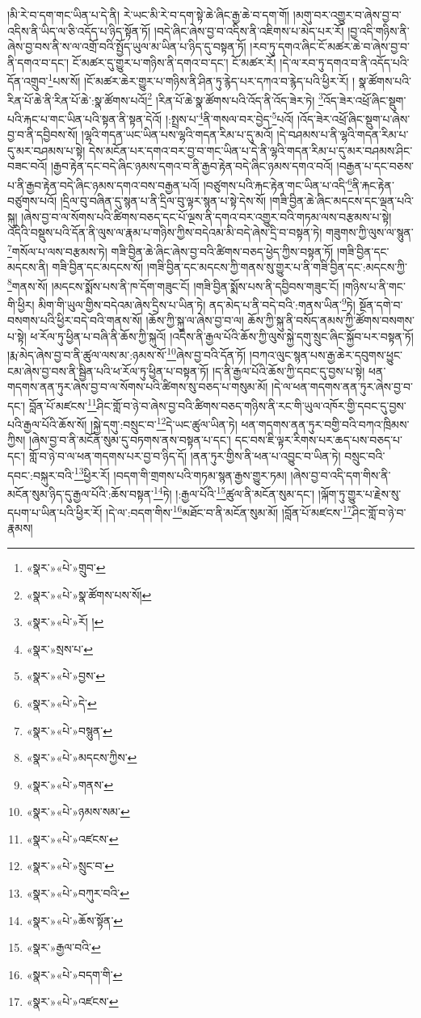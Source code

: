 །མི་རེ་བ་དག་གང་ཡིན་པ་དེ་ནི། རེ་ཡང་མི་རེ་བ་དག་སྟེ་ཆེ་ཞིང་རྒྱ་ཆེ་བ་དག་གོ། །མགུ་བར་འགྱུར་བ་ཞེས་བྱ་བ་འདིས་ནི་ཡིད་ལ་ཅི་འདོད་པ་ཉིད་སྟོན་ཏོ། །བདེ་ཞིང་ཞེས་བྱ་བ་འདིས་ནི་འཇིགས་པ་མེད་པར་རོ། །བྱ་འདི་གཉིས་ནི་ཞེས་བྱ་བས་ནི་ས་ལ་འགྲོ་བའི་སྤྱོད་ཡུལ་མ་ཡིན་པ་ཉིད་དུ་བསྟན་ཏོ། །རབ་ཏུ་དགའ་ཞིང་ངོ་མཚར་ཆེ་བ་ཞེས་བྱ་བ་ནི་དགའ་བ་དང་། ངོ་མཚར་དུ་གྱུར་པ་གཉིས་ནི་དགའ་བ་དང་། ངོ་མཚར་རོ། །དེ་ལ་རབ་ཏུ་དགའ་བ་ནི་འདོད་པའི་དོན་འགྲུབ་\footnote{«སྣར་»«པེ་»གྲུབ་}པས་སོ། །ངོ་མཚར་ཆེར་གྱུར་པ་གཉིས་ནི་ཤིན་ཏུ་རྙེད་པར་དཀའ་བ་རྙེད་པའི་ཕྱིར་རོ། །
སྣ་ཚོགས་པའི་རིན་པོ་ཆེ་ནི་རིན་པོ་ཆེ་:སྣ་ཚོགས་པའོ།\footnote{«སྣར་»«པེ་»སྣ་ཚོགས་པས་སོ།} །རིན་པོ་ཆེ་སྣ་ཚོགས་པའི་འོད་ནི་འོད་ཟེར་ཏེ། \footnote{«སྣར་»«པེ་»རོ། ། }འོད་ཟེར་འཕྲོ་ཞིང་སྡུག་པའི་རྐང་པ་གང་ཡིན་པའི་སྟན་ནི་སྟན་དེའོ། །:སྤྲས་པ་\footnote{«སྣར་»སྲས་པ་}ནི་གསལ་བར་བྱེད་\footnote{«སྣར་»«པེ་»བྱས་}པའོ། །འོད་ཟེར་འཕྲོ་ཞིང་སྡུག་པ་ཞེས་བྱ་བ་ནི་དབྱིབས་སོ། །ལྷའི་གདན་ཡང་ཡིན་པས་ལྷའི་གདན་རིམ་པ་དུ་མའོ། །དེ་བཤམས་པ་ནི་ལྷའི་གདན་རིམ་པ་དུ་མར་བཤམས་པ་སྟེ། དེས་མངོན་པར་དགའ་བར་བྱ་བ་གང་ཡིན་པ་དེ་ནི་ལྷའི་གདན་རིམ་པ་དུ་མར་བཤམས་ཤིང་བཟང་བའོ། །རྒྱབ་རྟེན་དང་བདེ་ཞིང་ཉམས་དགའ་བ་ནི་རྒྱབ་རྟེན་བདེ་ཞིང་ཉམས་དགའ་བའོ། །བརྒྱན་པ་དང་བཅས་པ་ནི་རྒྱབ་རྟེན་བདེ་ཞིང་ཉམས་དགའ་བས་བརྒྱན་པའོ། །བཙུགས་པའི་རྐང་རྟེན་གང་ཡིན་པ་འདི་\footnote{«སྣར་»«པེ་»དེ་}ནི་རྐང་རྟེན་བཙུགས་པའོ། །དྲིལ་བུ་བཞིན་དུ་སྙན་པ་ནི་དྲིལ་བུ་ལྟར་སྙན་པ་སྟེ་དེས་སོ། །གཟི་བྱིན་ཆེ་ཞིང་མདངས་དང་ལྡན་པའི་སྐུ། །ཞེས་བྱ་བ་ལ་སོགས་པའི་ཚིགས་བཅད་དང་པོ་ལྔས་ནི་དགའ་བར་འགྱུར་བའི་གཏམ་ལས་བརྩམས་པ་སྟེ། འདིའི་བསྡུས་པའི་དོན་ནི་ལུས་ལ་རྣམ་པ་གཉིས་ཀྱིས་བདེའམ་མི་བདེ་ཞེས་དྲི་བ་བསྟན་ཏེ། གཟུགས་ཀྱི་ལུས་ལ་སྙུན་\footnote{«སྣར་»«པེ་»བསྙུན་}གསོལ་པ་ལས་བརྩམས་ཏེ། གཟི་བྱིན་ཆེ་ཞིང་ཞེས་བྱ་བའི་ཚིགས་བཅད་ཕྱེད་ཀྱིས་བསྟན་ཏོ། །གཟི་བྱིན་དང་མདངས་ནི། གཟི་བྱིན་དང་མདངས་སོ། །གཟི་བྱིན་དང་མདངས་ཀྱི་གནས་སུ་གྱུར་པ་ནི་གཟི་བྱིན་དང་:མདངས་ཀྱི་\footnote{«སྣར་»«པེ་»མདངས་ཀྱིས་}གནས་སོ། །མདངས་སྨོས་པས་ནི་ཁ་དོག་གཟུང་ངོ། །གཟི་བྱིན་སྨོས་པས་ནི་དབྱིབས་གཟུང་ངོ། །གཉིས་པ་ནི་གང་གི་ཕྱིར། མིག་གི་ཡུལ་གྱིས་བདེའམ་ཞེས་དྲིས་པ་ཡིན་ཏེ། ནད་མེད་པ་ནི་བདེ་བའི་:གནས་ཡིན་\footnote{«སྣར་»«པེ་»གནས་}ཏེ། སྔོན་དགེ་བ་བསགས་པའི་ཕྱིར་བདེ་བའི་གནས་སོ། །ཆོས་ཀྱི་སྐུ་ལ་ཞེས་བྱ་བ་ལ། ཆོས་ཀྱི་སྐུ་ནི་བསོད་ནམས་ཀྱི་ཚོགས་བསགས་པ་སྟེ། ཕ་རོལ་ཏུ་ཕྱིན་པ་བཞི་ནི་ཆོས་ཀྱི་སྐུའོ། །འདིས་ནི་རྒྱལ་པོའི་ཆོས་ཀྱི་ལུས་སྐྱེ་དགུ་སྲུང་ཞིང་སྐྱོབ་པར་བསྟན་ཏོ། །རྨ་མེད་ཞེས་བྱ་བ་ནི་ཚུལ་ལས་མ་:ཉམས་སོ་\footnote{«སྣར་»«པེ་»ཉམས་སམ་}ཞེས་བྱ་བའི་དོན་ཏོ། །བཀའ་ལུང་སྙན་པས་རྒྱ་ཆེར་དབུགས་ཕྱུང་ངམ་ཞེས་བྱ་བས་ནི་སྦྱིན་པའི་ཕ་རོལ་ཏུ་ཕྱིན་པ་བསྟན་ཏོ། །ད་ནི་རྒྱལ་པོའི་ཆོས་ཀྱི་དབང་དུ་བྱས་པ་སྟེ། ཕན་གདགས་ནན་ཏུར་ཞེས་བྱ་བ་ལ་སོགས་པའི་ཚིགས་སུ་བཅད་པ་གསུམ་མོ། །དེ་ལ་ཕན་གདགས་ནན་ཏུར་ཞེས་བྱ་བ་དང་། བློན་པོ་མཛངས་\footnote{«སྣར་»«པེ་»འཛངས་}ཤིང་གློ་བ་ཉེ་བ་ཞེས་བྱ་བའི་ཚིགས་བཅད་གཉིས་ནི་རང་གི་ཡུལ་འཁོར་གྱི་དབང་དུ་བྱས་པའི་རྒྱལ་པོའི་ཆོས་སོ། །སྐྱེ་དགུ་:བསྲུང་བ་\footnote{«སྣར་»«པེ་»སྲུང་བ་}དེ་ཡང་ཚུལ་ཡིན་ཏེ། ཕན་གདགས་ནན་ཏུར་བགྱི་བའི་བཀའ་ཁྲིམས་ཀྱིས། །ཞེས་བྱ་བ་ནི་མངོན་སུམ་དུ་བཏགས་ནས་བསྟན་པ་དང་། དང་བས་ཇི་ལྟར་རིགས་པར་ཆད་པས་བཅད་པ་དང་། གློ་བ་ཉེ་བ་ལ་ཕན་གདགས་པར་བྱ་བ་ཉིད་དོ། །ནན་ཏུར་གྱིས་ནི་ཕན་པ་འབྱུང་བ་ཡིན་ཏེ། བསྲུང་བའི་དབང་:བསྐུར་བའི་\footnote{«སྣར་»«པེ་»བཀུར་བའི་}ཕྱིར་རོ། །བདག་གི་གྲགས་པའི་གཏམ་སྙན་རྒྱས་གྱུར་ཏམ། །ཞེས་བྱ་བ་འདི་དག་གིས་ནི་མངོན་སུམ་ཉིད་དུ་རྒྱལ་པོའི་:ཆོས་བསྟན་\footnote{«སྣར་»«པེ་»ཆོས་སྟོན་}ཏེ། །:རྒྱལ་པོའི་\footnote{«སྣར་»རྒྱལ་བའི་}ཚུལ་ནི་མངོན་སུམ་དང་། །ལྐོག་ཏུ་གྱུར་པ་རྗེས་སུ་དཔག་པ་ཡིན་པའི་ཕྱིར་རོ། །དེ་ལ་:བདག་གིས་\footnote{«སྣར་»«པེ་»བདག་གི་}མཐོང་བ་ནི་མངོན་སུམ་མོ། །བློན་པོ་མཛངས་\footnote{«སྣར་»«པེ་»འཛངས་}ཤིང་གློ་བ་ཉེ་བ་རྣམས། 